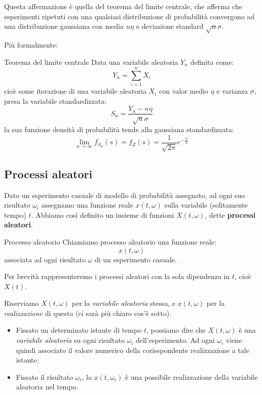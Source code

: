 \documentclass[a4paper,11pt]{article}
\begin{document}
Questa affermazione è quella del teorema del limite centrale, che afferma che esperimenti ripetuti con una qualsiasi distribuzione di probabilità convergono ad una distribuzione gaussiana con media $n \eta$ e deviazione standard $\sqrt{n} \sigma$.

Più formalmente:
\begin{theorem}{Teorema del limite centrale}
Data una variabile aleatoria $Y_n$ definita come:
$$
Y_n = \sum_{i=1}^n X_i
$$
cioè come iterazione di una variabile aleatoria $X_i$ con valor medio $\eta$ e varianza $\sigma$, presa la variabile standardizzata: 
$$
S_n = \frac{Y_n - n \eta}{\sqrt{n} \sigma}
$$
la sua funzione densità di probabilità tende alla gaussiana standardizzata:
$$
\lim_{n \rightarrow \infty} f_{S_n} (s) = f_Z(s) = \frac{1}{\sqrt{2\pi}} e^{-\frac{s^2}{2}}
$$
\end{theorem}

\subsection{Processi aleatori}
Dato un esperimento casuale di modello di probabilità assegnato, ad ogni suo risultato $\omega_i$ assegnamo una funzione reale $x(t, \omega)$ sulla variabile (solitamente tempo) $t$. Abbiamo così definito un insieme di funzioni $X(t, \omega)$, dette \textbf{processi aleatori}. 

\begin{definition}{Processo aleatorio}
Chiamiamo processo aleatorio una funzione reale:
$$
x(t, \omega)
$$
associata ad ogni risultato $\omega$ di un esperimento casuale.
\end{definition}

Per brevità rappresenteremo i processi aleatori con la sola dipendenza in $t$, cioè $X(t)$.

Riserviamo $X(t, \omega)$ per la \textit{variabile aleatoria} stessa, e $x(t, \omega)$ per la \textit{realizzazione} di questa (ci sarà più chiaro cos'è sotto).
\begin{itemize}
	\item Fissato un determinato istante di tempo $t$, possiamo dire che $X(t, \omega)$ è una \textit{variabile aleatoria} su ogni risultato $\omega_i$ dell'esperimento. Ad ogni $\omega_i$ viene quindi associato il valore numerico della corisspondente realizzazione a tale istante;
	\item Fissato il risultato $\omega_i$, la $x(t, \omega_i)$ è una possibile realizzazione della variabile aleatoria nel tempo.
\end{itemize}
\end{document}
